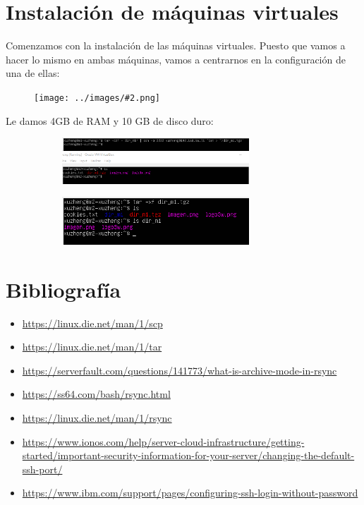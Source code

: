 \documentclass[twoside]{article}
\newcommand{\image}[2]{
\begin{figure}[H]
    \texttt{[image: ../images/\#2.png]}
    \centering
\end{figure}
}
\begin{document}
\section{Instalación de máquinas virtuales}
Comenzamos con la instalación de las máquinas virtuales. Puesto que vamos a hacer lo mismo en ambas máquinas, vamos a centrarnos en la configuración de una de ellas:
\image{8}{1}
Le damos 4GB de RAM y 10 GB de disco duro:
\begin{figure}[H]
    \centering
    \begin{subfigure}{.5\textwidth}
        \centering
        \includegraphics[width=7cm]{../images/2.png}
    \end{subfigure}%
    \begin{subfigure}{.5\textwidth}
        \centering
        \includegraphics[width=7cm]{../images/3.png}
    \end{subfigure}
\end{figure}
\fi

\newpage
\section{Bibliografía}
\begin{itemize}
    \item \url{https://linux.die.net/man/1/scp}
    \item \url{https://linux.die.net/man/1/tar}
    \item \url{https://serverfault.com/questions/141773/what-is-archive-mode-in-rsync}
    \item \url{https://ss64.com/bash/rsync.html}
    \item \url{https://linux.die.net/man/1/rsync}
    

    \item \url{https://www.ionos.com/help/server-cloud-infrastructure/getting-started/important-security-information-for-your-server/changing-the-default-ssh-port/}
    \item \url{https://www.ibm.com/support/pages/configuring-ssh-login-without-password}
\end{itemize}
\end{document}
